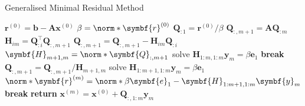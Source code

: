 \documentclass{article}
\begin{document}
\begin{algorithm}[H]
    \caption{Generalised Minimal Residual Method}
    \begin{algorithmic}
        \State \(\symbf{r}^{\left( 0 \right)} = \symbf{b} - \symbf{A} \symbf{x}^{\left( 0 \right)}\)
        \State \(\beta = \norm*{\symbf{r}^{\left( 0 \right)}}\)
        \State \(\symbf{Q}_{:1} = \symbf{r}^{\left( 0 \right)}/\beta\)
        \State \(\symbf{Q}_{:,m+1} = \symbf{A} \symbf{Q}_{:m}\) 
        \State \(\symbf{H}_{im} = \symbf{Q}_{:i}^\top \symbf{Q}_{:,m + 1}\)
        \State \(\symbf{Q}_{:,m+1} = \symbf{Q}_{:,m+1} - \symbf{H}_{im} \symbf{Q}_{:i}\)
        \EndFor
        \State \(\symbf{H}_{m+1,m} = \norm*{\symbf{Q}_{:,m+1}}\)
        \Statex
         
        \State solve \(\symbf{H}_{1:m,1:m} \symbf{y}_m = \beta \symbf{e}_1\)
        \State \textbf{break}
        \EndIf
        \State \(\symbf{Q}_{:,m+1} = \symbf{Q}_{:,m+1} / \symbf{H}_{m+1,m}\)
        \Statex
        \State solve \(\symbf{H}_{1:m+1,1:m} \symbf{y}_m = \beta \symbf{e}_1\) 
        \State \(\norm*{\symbf{r}^{\left( m \right)}} = \norm*{\beta \symbf{e}_1 - \symbf{H}_{1:m+1,1:m} \symbf{y}_m}\)
         
        \State \textbf{break}
        \EndIf
        \EndFor
        \State \textbf{return} \(\symbf{x}^{\left( m \right)} = \symbf{x}^{\left( 0 \right)} + \symbf{Q}_{:,1:m} \symbf{y}_m\)
    \end{algorithmic}
\end{algorithm}
\end{document}

